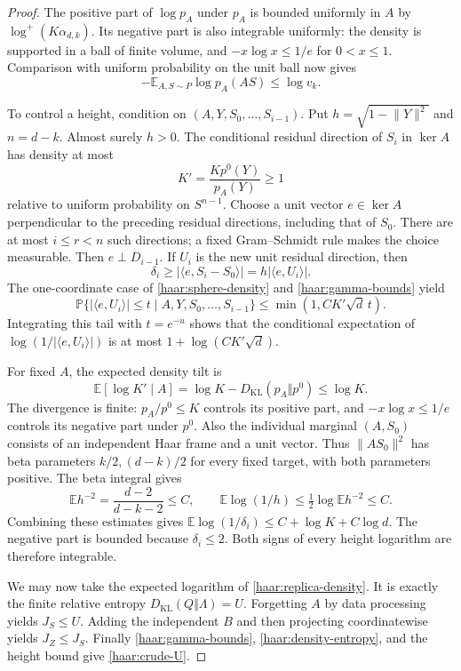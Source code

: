 \begin{proof}
The positive part of $\log p_A$ under $p_A$ is bounded uniformly in $A$
by $\log^+(K\alpha_{d,k})$.  Its negative part is also integrable
uniformly: the density is supported in a ball of finite volume, and
$-x\log x\le1/e$ for $0<x\le1$.  Comparison with uniform probability
on the unit ball now gives
\begin{equation}\label{haar:density-entropy}
 -\mathbb E_{A,S\sim P}\log p_A(AS)\le\log v_k.
\end{equation}

To control a height, condition on $(A,Y,S_0,\ldots,S_{i-1})$.  Put
$h=\sqrt{1-\lVert Y\rVert^2}$ and $n=d-k$.  Almost surely $h>0$.
The conditional residual direction of $S_i$ in $\ker A$ has density at
most
\[
 K'=\frac{Kp^0(Y)}{p_A(Y)}\ge1
\]
relative to uniform probability on $S^{n-1}$.  Choose a unit vector
$e\in\ker A$ perpendicular to the preceding residual directions,
including that of $S_0$.  There are at most $i\le r<n$ such directions;
a fixed Gram--Schmidt rule makes the choice measurable.  Then
$e\perp D_{i-1}$.  If $U_i$ is
the new unit residual direction, then
\[
 \delta_i\ge |\langle e,S_i-S_0\rangle|
             =h|\langle e,U_i\rangle|.
\]
The one-coordinate case of \eqref{haar:sphere-density} and
\eqref{haar:gamma-bounds} yield
\[
 \mathbb P\{|\langle e,U_i\rangle|\le t
       \mid A,Y,S_0,\ldots,S_{i-1}\}
 \le\min(1,CK'\sqrt d\,t).
\]
Integrating this tail with $t=e^{-u}$ shows that the conditional
expectation of $\log(1/|\langle e,U_i\rangle|)$ is at most
$1+\log(CK'\sqrt d)$.

For fixed $A$, the expected density tilt is
\[
 \mathbb E[\log K'\mid A]
  =\log K-D_{\mathrm{KL}}(p_A\Vert p^0)\le\log K.
\]
The divergence is finite: $p_A/p^0\le K$ controls its positive part,
and $-x\log x\le1/e$ controls its negative part under $p^0$.  Also the
individual marginal $(A,S_0)$ consists of an independent Haar frame and
a unit vector.  Thus $\lVert AS_0\rVert^2$ has beta parameters
$k/2,(d-k)/2$ for every fixed target, with both parameters positive.
The beta integral gives
\begin{equation}\label{haar:radius-moment}
 \mathbb E h^{-2}=\frac{d-2}{d-k-2}\le C,
 \qquad \mathbb E\log(1/h)\le\tfrac12\log\mathbb E h^{-2}\le C.
\end{equation}
Combining these estimates gives
$\mathbb E\log(1/\delta_i)\le C+\log K+C\log d$.
The negative part is bounded because $\delta_i\le2$.  Both signs of
every height logarithm are therefore integrable.

We may now take the expected logarithm of
\eqref{haar:replica-density}.  It is exactly the finite relative entropy
$D_{\mathrm{KL}}(Q\Vert\Lambda)=U$.
Forgetting $A$ by data processing yields $J_S\le U$.  Adding the
independent $B$ and then projecting coordinatewise yields $J_Z\le J_S$.
Finally \eqref{haar:gamma-bounds}, \eqref{haar:density-entropy}, and
the height bound give \eqref{haar:crude-U}.
\end{proof}

